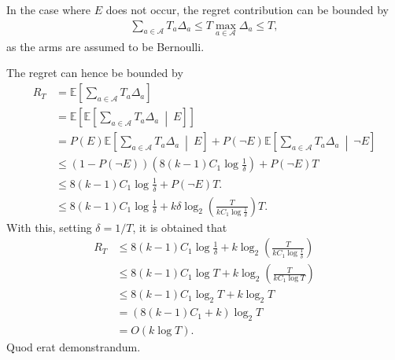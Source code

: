 In the case where $E$ does not occur, the regret contribution can be bounded by
\begin{equation}
    \begin{aligned}
        \sum_{a \in \mathcal{A}} T_a \Delta_a \leq T \max_{a\in \mathcal{A}} \Delta_a \leq T,
    \end{aligned}
\end{equation}
as the arms are assumed to be Bernoulli.

The regret can hence be bounded by
\begin{equation}
    \begin{aligned}
        R_T
         & =
        \mathbb{E}\left[ \sum_{a \in \mathcal{A}} T_a \Delta_a \right]
        \\
         & =
        \mathbb{E}\left[ \mathbb{E}\left[ \sum_{a \in \mathcal{A}} T_a \Delta_a \ \middle| \ E \right] \right]
        \\
         & = P(E) \mathbb{E}\left[ \sum_{a \in \mathcal{A}} T_a \Delta_a \ \middle| \ E \right] + P(\neg E) \mathbb{E}\left[ \sum_{a \in \mathcal{A}} T_a \Delta_a \ \middle| \ \neg E \right]
        \\
         & \leq
        (1 - P(\neg E)) \left( 8(k-1)C_1 \log \frac1\delta \right)
        + P(\neg E) T
        \\
         & \leq
        8(k-1)C_1 \log \frac1\delta + P(\neg E) T.
        \\
         & \leq
        8(k-1)C_1 \log \frac1\delta + k\delta \log_2 \left(\frac{T}{kC_1 \log \frac1\delta}\right) T.
    \end{aligned}
\end{equation}
With this, setting $\delta = 1/T$, it is obtained that
\begin{equation}
    \begin{aligned}
        R_T
         & \leq
        8(k-1)C_1 \log \frac1\delta + k \log_2 \left(\frac{T}{kC_1 \log \frac1\delta}\right)
        \\
         & \leq
        8(k-1)C_1 \log T + k \log_2 \left(\frac{T}{kC_1 \log T}\right)
        \\
         & \leq
        8(k-1)C_1 \log_2 T + k \log_2 T
        \\
         & =
        (8(k-1)C_1 + k) \log_2 T
        \\
         & =
        O(k \log T).
    \end{aligned}
\end{equation}
Quod erat demonstrandum.

